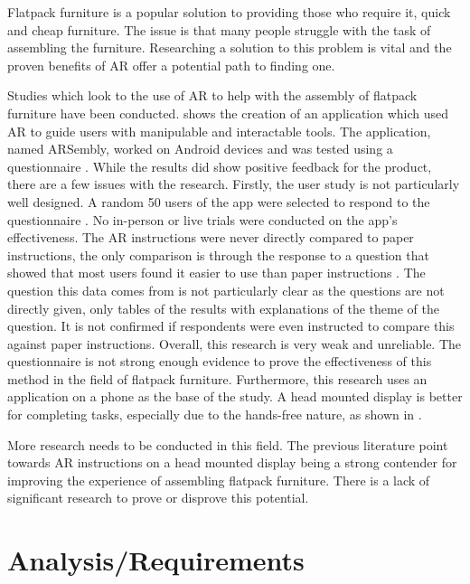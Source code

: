 \documentclass{l4proj}
\begin{document}
Flatpack furniture is a popular solution to providing those who require it, quick and cheap furniture. The issue is that many people struggle with the task of assembling the furniture. Researching a solution to this problem is vital and the proven benefits of AR offer a potential path to finding one.

Studies which look to the use of AR to help with the assembly of flatpack furniture have been conducted. \citet{hartanto_development_2019} shows the creation of an application which used AR to guide users with manipulable and interactable tools. The application, named ARSembly, worked on Android devices and was tested using a questionnaire \citep{hartanto_development_2019}. While the results did show positive feedback for the product, there are a few issues with the research. Firstly, the user study is not particularly well designed. A random 50 users of the app were selected to respond to the questionnaire \citep{hartanto_development_2019}. No in-person or live trials were conducted on the app's effectiveness. The AR instructions were never directly compared to paper instructions, the only comparison is through the response to a question that showed that most users found it easier to use than paper instructions \citep{hartanto_development_2019}. The question this data comes from is not particularly clear as the questions are not directly given, only tables of the results with explanations of the theme of the question. It is not confirmed if respondents were even instructed to compare this against paper instructions. Overall, this research is very weak and unreliable. The questionnaire is not strong enough evidence to prove the effectiveness of this method in the field of flatpack furniture. Furthermore, this research uses an application on a phone as the base of the study. A head mounted display is better for completing tasks, especially due to the hands-free nature, as shown in \citep{blattgerste_comparing_2017, chen_papertoplace_2023}.

More research needs to be conducted in this field. The previous literature point towards AR instructions on a head mounted display being a strong contender for improving the experience of assembling flatpack furniture. There is a lack of significant research to prove or disprove this potential.

\chapter{Analysis/Requirements}
\label{chap:analysis}
\end{document}
